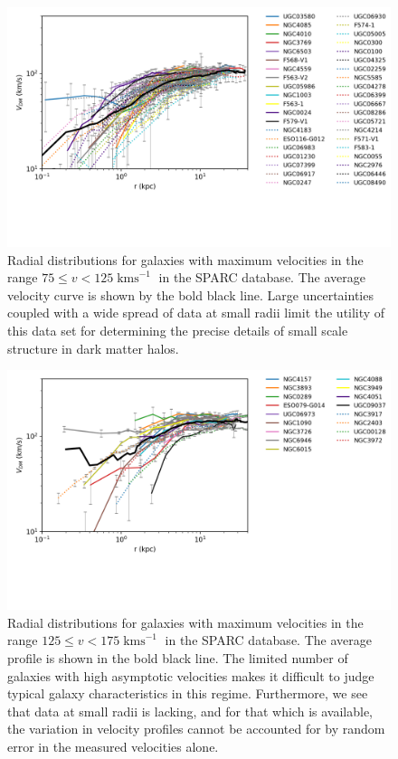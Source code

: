 \documentclass{pasa}%
\begin{document}
\begin{appendix}
\begin{figure}[t]
\centering
\includegraphics[scale=0.9, trim={0.5cm 3cm 0cm 1cm}]{errors_small_radius_w_leg_mean.png}
\caption{Radial distributions for galaxies with maximum velocities in the range $75 \leq v < 125\operatorname{kms}^{-1}$ in the SPARC database. The average velocity curve is shown by the bold black line. Large uncertainties coupled with a wide spread of data at small radii limit the utility of this data set for determining the precise details of small scale structure in dark matter halos.}\label{fig:low_v_err}
\end{figure}

\begin{figure}[t]
\centering
\includegraphics[scale=0.9, trim={0.5cm 3cm 0cm 1cm}]{errors_large_radius_w_leg_mean.png}
\caption{Radial distributions for galaxies with maximum velocities in the range $125 \leq v < 175\operatorname{kms}^{-1}$ in the SPARC database. The average profile is shown in the bold black line. The limited number of galaxies with high asymptotic velocities makes it difficult to judge typical galaxy characteristics in this regime. Furthermore, we see that data at small radii is lacking, and for that which is available, the variation in velocity profiles cannot be accounted for by random error in the measured velocities alone.}\label{fig:high_v_err}
\end{figure}
 
 
\end{appendix}



\end{document}
